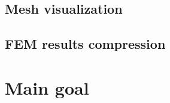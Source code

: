 


\subsection{Mesh visualization}



\subsection{FEM results compression}



\section{Main goal} %



